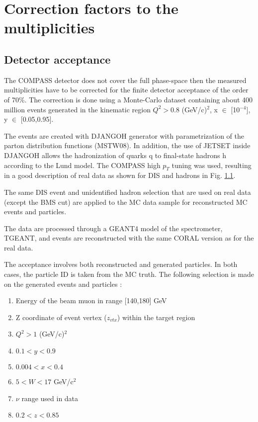 
\chapter{Correction factors to the multiplicities} %

\label{ch:CF} %


\section{Detector acceptance}

The COMPASS detector does not cover the full phase-space then the measured multiplicities have
to be corrected for the finite detector acceptance of the order of 70\%. The correction is
done using a Monte-Carlo dataset containing about 400 million events generated in the kinematic
region $Q^2 > 0.8$ (GeV/c)$^2$, x $\in$ [10$^{-4}$], y $\in$ [0.05,0.95].

The events are created with DJANGOH generator with parametrization of the parton distribution functions
(MSTW08). In addition, the use of JETSET inside DJANGOH allows the hadronization of quarks q to final-state
hadrons h according to the Lund model. The COMPASS high $p_T$ tuning was used, resulting in a good description
of real data as shown for DIS and hadrons in Fig. \ref{}.

The same DIS event and unidentified hadron selection that are used on real data (except the BMS cut) are applied
to the MC data sample for reconstructed MC events and particles.

The data are processed through a GEANT4 model of the spectrometer, TGEANT, and events are reconstructed with the
same CORAL version as for the real data.

The acceptance involves both reconstructed and generated particles. In both cases, the particle ID is taken from
the MC truth. The following selection is made on the generated events and particles :

\begin{enumerate}
  \item Energy of the beam muon in range [140,180] GeV
  \item Z coordinate of event vertex ($z_{vtx}$) within the target region
  \item $Q^2>1$ (GeV/c)$^2$
  \item $0.1 < y < 0.9$
  \item $0.004 < x < 0.4$
  \item $5 < W < 17$ GeV/c$^2$
  \item $\nu$ range used in data
  \item $0.2 < z < 0.85$
\end{enumerate}

